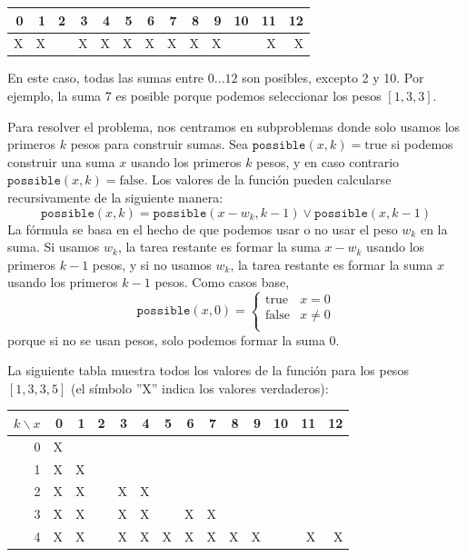 \begin{center}
\begin{tabular}{rrrrrrrrrrrrr}
 0 & 1 & 2 & 3 & 4 & 5 & 6 & 7 & 8 & 9 & 10 & 11 & 12 \\
\hline
 X & X & & X & X & X & X & X & X & X & & X & X \\
\end{tabular}
\end{center}

En este caso, todas las sumas entre $0 \ldots 12$
son posibles, excepto 2 y 10.
Por ejemplo, la suma 7 es posible porque
podemos seleccionar los pesos $[1,3,3]$.

Para resolver el problema, nos centramos en subproblemas
donde solo usamos los primeros $k$ pesos
para construir sumas.
Sea $\texttt{possible}(x,k)=\textrm{true}$ si
podemos construir una suma $x$
usando los primeros $k$ pesos,
y en caso contrario $\texttt{possible}(x,k)=\textrm{false}$.
Los valores de la función pueden calcularse
recursivamente de la siguiente manera:
\[ \texttt{possible}(x,k) = \texttt{possible}(x-w_k,k-1) \lor \texttt{possible}(x,k-1) \]
La fórmula se basa en el hecho de que podemos
usar o no usar el peso $w_k$ en la suma.
Si usamos $w_k$, la tarea restante es
formar la suma $x-w_k$ usando los primeros $k-1$ pesos,
y si no usamos $w_k$,
la tarea restante es formar la suma $x$
usando los primeros $k-1$ pesos.
Como casos base,
\begin{equation*}
    \texttt{possible}(x,0) = \begin{cases}
               \textrm{true}    & x = 0\\
               \textrm{false}   & x \neq 0 \\
           \end{cases}
\end{equation*}
porque si no se usan pesos,
solo podemos formar la suma 0.

La siguiente tabla muestra todos los valores de la función
para los pesos $[1,3,3,5]$ (el símbolo ''X''
indica los valores verdaderos):

\begin{center}
\begin{tabular}{r|rrrrrrrrrrrrr}
$k \backslash x$ & 0 & 1 & 2 & 3 & 4 & 5 & 6 & 7 & 8 & 9 & 10 & 11 & 12 \\
\hline
 0 & X & \\
 1 & X & X \\
 2 & X & X & & X & X \\
 3 & X & X & & X & X & & X & X \\
 4 & X & X & & X & X & X & X & X & X & X & & X & X \\
\end{tabular}
\end{center}

